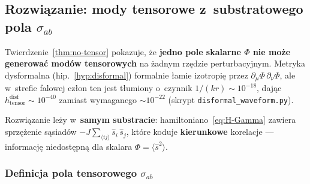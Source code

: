 \subsection{Rozwi\k{a}zanie: mody tensorowe z~substratowego pola $\sigma_{ab}$}%
\label{ssec:tensor-substrate}

\noindent{}

\medskip
Twierdzenie~\ref{thm:no-tensor} pokazuje, \.ze
\textbf{jedno pole skalarne $\Phi$ nie mo\.ze generowa\'c
mod\'ow tensorowych} na \.zadnym rz\k{e}dzie perturbacyjnym.
Metryka dysformalna (hip.~\ref{hyp:disformal}) formalnie
\l{}amie izotropi\k{e} przez $\partial_\mu\Phi\,\partial_\nu\Phi$,
ale w~strefie falowej cz\l{}on ten jest t\l{}umiony
o~czynnik $1/(kr) \sim 10^{-18}$, daj\k{a}c
$h_{\mathrm{tensor}}^{\mathrm{disf}} \sim 10^{-40}$
zamiast wymaganego $\sim 10^{-22}$
(skrypt \texttt{disformal\_waveform.py}).

Rozwi\k{a}zanie le\.zy w~\textbf{samym substracie}:
hamiltoniano~\eqref{eq:H-Gamma} zawiera
sprz\k{e}\.zenie s\k{a}siad\'ow
$-J\sum_{\langle ij\rangle}\hat{s}_i\,\hat{s}_j$,
kt\'ore koduje \textbf{kierunkowe} korelacje
--- informacj\k{e} niedost\k{e}pn\k{a}
dla skalara $\Phi = \langle\hat{s}^2\rangle$.

\subsubsection{Definicja pola tensorowego $\sigma_{ab}$}

